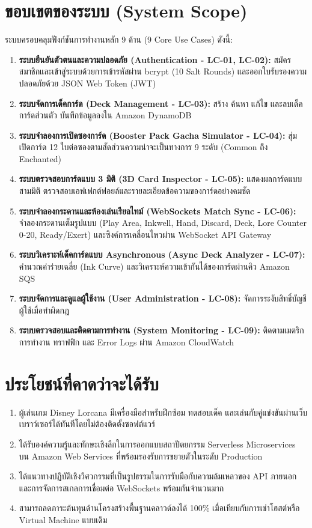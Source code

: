 \documentclass[12pt,a4paper]{report}
\begin{document}
\section{ขอบเขตของระบบ (System Scope)}
ระบบครอบคลุมฟังก์ชันการทำงานหลัก 9 ด้าน (9 Core Use Cases) ดังนี้:
\begin{enumerate}
    \item \textbf{ระบบยืนยันตัวตนและความปลอดภัย (Authentication - LC-01, LC-02):} สมัครสมาชิกและเข้าสู่ระบบด้วยการเข้ารหัสผ่าน bcrypt (10 Salt Rounds) และออกใบรับรองความปลอดภัยด้วย JSON Web Token (JWT)
    \item \textbf{ระบบจัดการเด็คการ์ด (Deck Management - LC-03):} สร้าง ค้นหา แก้ไข และลบเด็คการ์ดส่วนตัว บันทึกข้อมูลลงใน Amazon DynamoDB
    \item \textbf{ระบบจำลองการเปิดซองการ์ด (Booster Pack Gacha Simulator - LC-04):} สุ่มเปิดการ์ด 12 ใบต่อซองตามสัดส่วนความน่าจะเป็นทางการ 9 ระดับ (Common ถึง Enchanted)
    \item \textbf{ระบบตรวจสอบการ์ดแบบ 3 มิติ (3D Card Inspector - LC-05):} แสดงผลการ์ดแบบสามมิติ ตรวจสอบเอฟเฟกต์ฟอยล์และรายละเอียดข้อความของการ์ดอย่างคมชัด
    \item \textbf{ระบบจำลองกระดานและห้องเล่นเรียลไทม์ (WebSockets Match Sync - LC-06):} จำลองกระดานเต็มรูปแบบ (Play Area, Inkwell, Hand, Discard, Deck, Lore Counter 0-20, Ready/Exert) และซิงค์การเคลื่อนไหวผ่าน WebSocket API Gateway
    \item \textbf{ระบบวิเคราะห์เด็คการ์ดแบบ Asynchronous (Async Deck Analyzer - LC-07):} คำนวณค่าร่ายเฉลี่ย (Ink Curve) และวิเคราะห์ความเข้ากันได้ของการ์ดผ่านคิว Amazon SQS
    \item \textbf{ระบบจัดการและดูแลผู้ใช้งาน (User Administration - LC-08):} จัดการระงับสิทธิ์บัญชีผู้ใช้เมื่อทำผิดกฎ
    \item \textbf{ระบบตรวจสอบและติดตามการทำงาน (System Monitoring - LC-09):} ติดตามเมตริกการทำงาน ทราฟฟิก และ Error Logs ผ่าน Amazon CloudWatch
\end{enumerate}

\section{ประโยชน์ที่คาดว่าจะได้รับ}
\begin{enumerate}
    \item ผู้เล่นเกม Disney Lorcana มีเครื่องมือสำหรับฝึกซ้อม ทดสอบเด็ค และเล่นกับคู่แข่งขันผ่านเว็บเบราว์เซอร์ได้ทันทีโดยไม่ต้องติดตั้งซอฟต์แวร์
    \item ได้รับองค์ความรู้และทักษะเชิงลึกในการออกแบบสถาปัตยกรรม Serverless Microservices บน Amazon Web Services ที่พร้อมรองรับการขยายตัวในระดับ Production
    \item ได้แนวทางปฏิบัติเชิงวิศวกรรมที่เป็นรูปธรรมในการรับมือกับความล้มเหลวของ API ภายนอก และการจัดการสเกลการเชื่อมต่อ WebSockets พร้อมกันจำนวนมาก
    \item สามารถลดภาระต้นทุนด้านโครงสร้างพื้นฐานคลาวด์ลงได้ 100\% เมื่อเทียบกับการเช่าโฮสต์หรือ Virtual Machine แบบเดิม
\end{enumerate}
\end{document}
